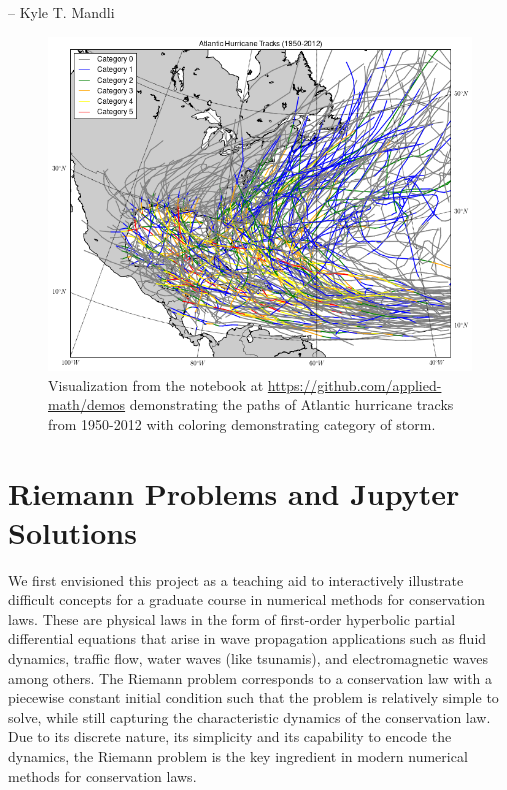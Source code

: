 \documentclass[]{book}
\begin{document}
-- Kyle T. Mandli

\begin{figure}
\centering
\includegraphics{images/hurricanes.png}
\caption{Visualization from the notebook at
\url{https://github.com/applied-math/demos}
demonstrating the paths of Atlantic hurricane tracks from 1950-2012
with coloring demonstrating category of storm.}
\end{figure}

\hypertarget{riemann-problems-and-jupyter-solutions}{%
\section{Riemann Problems and Jupyter Solutions}\label{riemann-problems-and-jupyter-solutions}}

We first envisioned this project as a teaching aid to interactively illustrate difficult concepts for a graduate course in numerical methods for conservation laws. These are physical laws in the form of first-order hyperbolic partial differential equations that arise in wave propagation applications such as fluid dynamics, traffic flow, water waves (like tsunamis), and electromagnetic waves among others. The Riemann problem corresponds to a conservation law with a piecewise constant initial condition such that the problem is relatively simple to solve, while still capturing the characteristic dynamics of the conservation law. Due to its discrete nature, its simplicity and its capability to encode the dynamics, the Riemann problem is the key ingredient in modern numerical methods for conservation laws.
\end{document}
